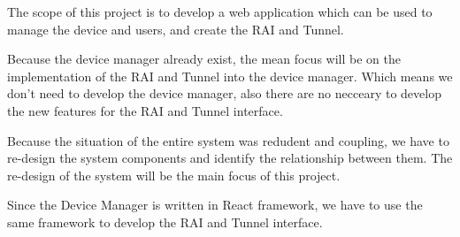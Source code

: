 The scope of this project is to develop a web application 
which can be used to manage the device and users, 
and create the RAI and Tunnel.

Because the device manager already exist, 
the mean focus will be on the implementation of the RAI and Tunnel into the device manager.
Which means we don't need to develop the device manager, 
also there are no necceary to develop the new features for the RAI and Tunnel interface.

Because the situation of the entire system was redudent and coupling, 
we have to re-design the system components and identify the relationship between them.
The re-design of the system will be the main focus of this project.

Since the Device Manager is written in React framework, 
we have to use the same framework to develop the RAI and Tunnel interface.
